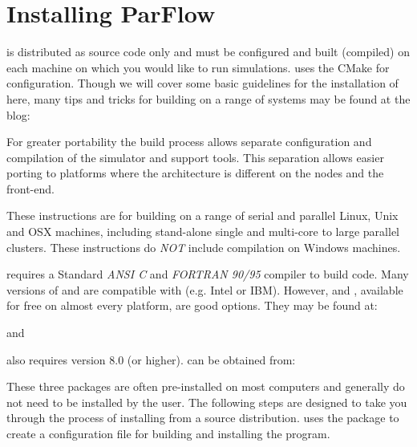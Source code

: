 

\section{Installing ParFlow}
\label{Installing ParFlow}

\parflow{} is distributed as source code only and must be configured
and built (compiled) on each machine on which you would like to run
simulations.  \parflow{} uses the CMake for configuration.  Though we
will cover some basic guidelines for the installation of \parflow{}
here, many tips and tricks for building \parflow{} on a range of
systems may be found at the \parflow{} blog:

For greater portability the \parflow{} build process allows separate
configuration and compilation of the simulator and support tools.
This separation allows easier porting to platforms where the
architecture is different on the nodes and the front-end.

These instructions are for building \parflow{} on a range of serial
and parallel Linux, Unix and OSX machines, including stand-alone
single and multi-core to large parallel clusters.  These instructions
do \emph{NOT} include compilation on Windows machines.

\parflow{} requires a Standard \emph{ANSI C} and \emph{FORTRAN 90/95}
compiler to build code. Many versions of  and  are
compatible with \parflow{} (e.g. Intel or IBM).  However,  and , available for
free on almost every platform, are good options. They may be found at:
\begin{center}
\end{center}
and
\begin{center}
\end{center}
\parflow{} also requires  version 8.0 (or higher).   can be obtained from:
\begin{center}
\end{center}
These three packages are often pre-installed on most computers and
generally do not need to be installed by the user.  The following
steps are designed to take you through the process of installing
\parflow{} from a source distribution.  \parflow{} uses the 
package  to create a configuration file for building
and installing the \parflow{} program.

